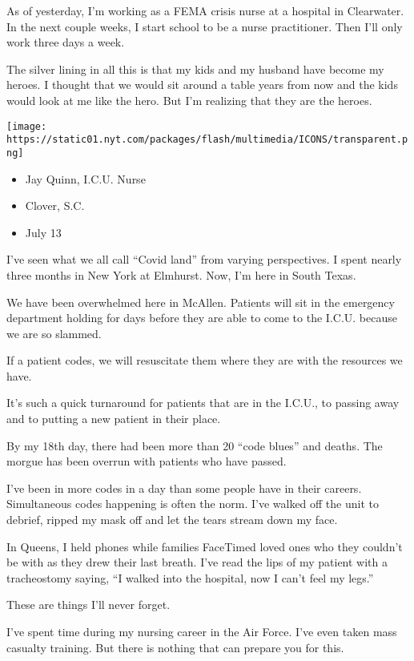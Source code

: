 As of yesterday, I'm working as a FEMA crisis nurse at a hospital in
Clearwater. In the next couple weeks, I start school to be a nurse
practitioner. Then I'll only work three days a week.

The silver lining in all this is that my kids and my husband have become
my heroes. I thought that we would sit around a table years from now and
the kids would look at me like the hero. But I'm realizing that they are
the heroes.

\texttt{[image: https://static01.nyt.com/packages/flash/multimedia/ICONS/transparent.png]}

\begin{itemize}
\tightlist
\item
  Jay Quinn, I.C.U. Nurse
\item
  Clover, S.C.
\item
  July 13
\end{itemize}

I've seen what we all call ``Covid land'' from varying perspectives. I
spent nearly three months in New York at Elmhurst. Now, I'm here in
South Texas.

We have been overwhelmed here in McAllen. Patients will sit in the
emergency department holding for days before they are able to come to
the I.C.U. because we are so slammed.

If a patient codes, we will resuscitate them where they are with the
resources we have.

It's such a quick turnaround for patients that are in the I.C.U., to
passing away and to putting a new patient in their place.

By my 18th day, there had been more than 20 ``code blues'' and deaths.
The morgue has been overrun with patients who have passed.

I've been in more codes in a day than some people have in their careers.
Simultaneous codes happening is often the norm. I've walked off the unit
to debrief, ripped my mask off and let the tears stream down my face.

In Queens, I held phones while families FaceTimed loved ones who they
couldn't be with as they drew their last breath. I've read the lips of
my patient with a tracheostomy saying, ``I walked into the hospital, now
I can't feel my legs.''

These are things I'll never forget.

I've spent time during my nursing career in the Air Force. I've even
taken mass casualty training. But there is nothing that can prepare you
for this.

